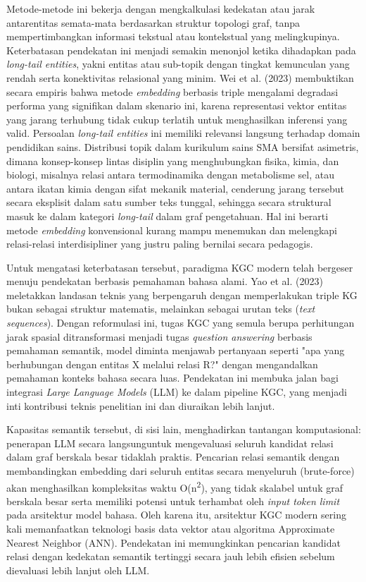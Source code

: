 \documentclass[
]{article}
\begin{document}
Metode-metode ini bekerja dengan mengkalkulasi kedekatan atau jarak
antarentitas semata-mata berdasarkan struktur topologi graf, tanpa
mempertimbangkan informasi tekstual atau kontekstual yang melingkupinya.
Keterbatasan pendekatan ini menjadi semakin menonjol ketika dihadapkan
pada \emph{long-tail entities}, yakni entitas atau sub-topik dengan
tingkat kemunculan yang rendah serta konektivitas relasional yang minim.
Wei et al. (2023) membuktikan secara empiris bahwa metode
\emph{embedding} berbasis triple mengalami degradasi performa yang
signifikan dalam skenario ini, karena representasi vektor entitas yang
jarang terhubung tidak cukup terlatih untuk menghasilkan inferensi yang
valid. Persoalan \emph{long-tail entities} ini memiliki relevansi
langsung terhadap domain pendidikan sains. Distribusi topik dalam
kurikulum sains SMA bersifat asimetris, dimana konsep-konsep lintas
disiplin yang menghubungkan fisika, kimia, dan biologi, misalnya relasi
antara termodinamika dengan metabolisme sel, atau antara ikatan kimia
dengan sifat mekanik material, cenderung jarang tersebut secara
eksplisit dalam satu sumber teks tunggal, sehingga secara struktural
masuk ke dalam kategori \emph{long-tail} dalam graf pengetahuan. Hal ini
berarti metode \emph{embedding} konvensional kurang mampu menemukan dan
melengkapi relasi-relasi interdisipliner yang justru paling bernilai
secara pedagogis.

Untuk mengatasi keterbatasan tersebut, paradigma KGC modern telah
bergeser menuju pendekatan berbasis pemahaman bahasa alami. Yao et al.
(2023) meletakkan landasan teknis yang berpengaruh dengan memperlakukan
triple KG bukan sebagai struktur matematis, melainkan sebagai urutan
teks (\emph{text sequences}). Dengan reformulasi ini, tugas KGC yang
semula berupa perhitungan jarak spasial ditransformasi menjadi tugas
\emph{question answering} berbasis pemahaman semantik, model diminta
menjawab pertanyaan seperti "apa yang berhubungan dengan entitas X
melalui relasi R?" dengan mengandalkan pemahaman konteks bahasa secara
luas. Pendekatan ini membuka jalan bagi integrasi \emph{Large Language
Models} (LLM) ke dalam pipeline KGC, yang menjadi inti kontribusi teknis
penelitian ini dan diuraikan lebih lanjut.

Kapasitas semantik tersebut, di sisi lain, menghadirkan tantangan
komputasional: penerapan LLM secara langsunguntuk mengevaluasi seluruh
kandidat relasi dalam graf berskala besar tidaklah praktis. Pencarian
relasi semantik dengan membandingkan embedding dari seluruh entitas
secara menyeluruh (brute-force) akan menghasilkan kompleksitas waktu
O(n\textsuperscript{2}), yang tidak skalabel untuk graf berskala besar
serta memiliki potensi untuk terhambat oleh \emph{input token limit}
pada arsitektur model bahasa. Oleh karena itu, arsitektur KGC modern
sering kali memanfaatkan teknologi basis data vektor atau algoritma
Approximate Nearest Neighbor (ANN). Pendekatan ini memungkinkan
pencarian kandidat relasi dengan kedekatan semantik tertinggi secara
jauh lebih efisien sebelum dievaluasi lebih lanjut oleh LLM.
\end{document}
